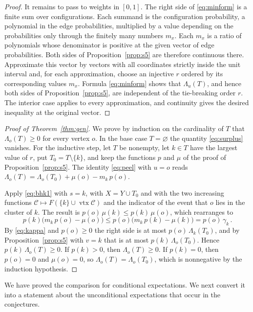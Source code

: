 \documentclass[11pt]{article}
\theoremstyle{definition}
\theoremstyle{remark}
\newcommand{\eC}{\mathcal C}
\DeclareMathOperator{\vtx}{vtx}
\begin{document}
\begin{proof}
It remains to pass to weights in $[0,1]$. The right side of \eqref{eq:minform} is a finite
sum over configurations. Each summand is the configuration probability, a polynomial in
the edge probabilities, multiplied by a value depending on the probabilities only through
the finitely many numbers $m_x$. Each $m_x$ is a ratio of polynomials whose denominator is
positive at the given vector of edge probabilities. Both sides of
Proposition~\ref{prop:s5} are therefore continuous there. Approximate this vector by
vectors with all coordinates strictly inside the unit interval and, for each approximation,
choose an injective $r$ ordered by its corresponding values $m_x$. Formula
\eqref{eq:minform} shows that $\Lambda_u(T)$, and hence both sides of
Proposition~\ref{prop:s5}, are independent of the tie-breaking order $r$. The interior
case applies to every approximation, and continuity gives the desired inequality at the
original vector.
\end{proof}

\begin{proof}[Proof of Theorem~\ref{thm:gen}]
We prove by induction on the cardinality of $T$ that $\Lambda_o(T)\geq0$ for every vertex
$o$. In the base case $T=\varnothing$ the quantity \eqref{eq:surplus} vanishes. For the
inductive step, let $T$ be nonempty, let $k\in T$ have the largest value of $r$, put
$T_0=T\setminus\{k\}$, and keep the functions $p$ and $\mu$ of the proof of
Proposition~\ref{prop:s5}. The identity \eqref{eq:peel} with $u=o$ reads
$\Lambda_o(T)=\Lambda_o(T_0)+\mu(o)-m_k\,p(o)$.

Apply \eqref{eq:bhk1} with $s=k$, with $X=Y\cup T_0$ and with the two increasing functions
$\eC\mapsto F(\{k\}\cup\vtx\eC)$ and the indicator of the event that $o$ lies in the cluster
of $k$. The result is $p(o)\,\mu(k)\leq p(k)\,\mu(o)$, which rearranges to
\[
 p(k)\bigl(m_k\,p(o)-\mu(o)\bigr)\leq p(o)\bigl(m_k\,p(k)-\mu(k)\bigr)=p(o)\,\gamma_k\,.
\]
By \eqref{eq:kappa} and $p(o)\geq0$ the right side is at most $p(o)\,\Lambda_k(T_0)$, and
by Proposition~\ref{prop:s5} with $v=k$ that is at most $p(k)\,\Lambda_o(T_0)$. Hence
$p(k)\,\Lambda_o(T)\geq0$. If $p(k)>0$, then $\Lambda_o(T)\geq0$. If $p(k)=0$, then
$p(o)=0$ and $\mu(o)=0$, so $\Lambda_o(T)=\Lambda_o(T_0)$, which is nonnegative by the
induction hypothesis.
\end{proof}

We have proved the comparison for conditional expectations. We next convert it into a
statement about the unconditional expectations that occur in the conjectures.
\end{document}

